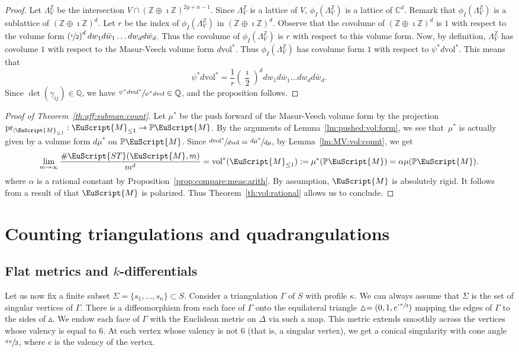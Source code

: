 \documentclass[JEP,XML,SOM,Unicode]{cedram}
\let\mathcal\EuScript
\theoremstyle{plain}
\theoremstyle{definition}
\def\C{\mathbb{C}}
\newcommand\Z{\mathbb{Z}}
\newcommand{\Q}{\mathbb{Q}}
\newcommand{\Pb}{\mathbb{P}}
\newcommand{\cM}{\mathcal{M}}
\newcommand{\ST}{\mathcal{ST}}
\newcommand{\vol}{\mathrm{vol}}
\newcommand{\pr}{\mathrm{pr}}
\let\G\Gamma
\begin{document}
\begin{proof}
Let $\Lambda^\Z_V$ be the intersection $V\cap(\Z\oplus\imath\Z)^{2g+n-1}$. Since $\Lambda^\Z_V$ is a lattice of $V$, $\phi_I(\Lambda^\Z_V)$ is a lattice of $\C^d$. Remark that $\phi_I(\Lambda^\Z_V)$ is a sublattice of $(\Z\oplus\imath\Z)^d$. Let $r$ be the index of $\phi_I(\Lambda^\Z_V)$ in $(\Z\oplus\imath\Z)^d$. Observe that the covolume of $(\Z\oplus\imath\Z)^d$ is $1$ with respect to the volume form $\left(\sfrac{\imath}{2}\right)^ddw_1d\bar{w}_1\dots dw_d d\bar{w}_d$. Thus the covolume of $\phi_I(\Lambda^\Z_V)$ is $r$ with respect to this volume form.
Now, by definition, $\Lambda^\Z_V$ has covolume $1$ with respect to the Masur-Veech volume form $d\vol^*$. Thus $\phi_I(\Lambda^\Z_V)$ has covolume form $1$ with respect to $\psi^*d\vol^*$. This means that
\[
\psi^*d\vol^*=\frac{1}{r}\left(\frac{\imath}{2}\right)^ddw_1d\bar{w}_1\dots dw_d d\bar{w}_d.
\]
Since $\det(\gamma_{ij}) \in \Q$, we have $\sfrac{\psi^*d\vol^*}{\psi^*d\vol} \in \Q$, and the proposition follows.
\end{proof}

\begin{proof}[Proof of Theorem~\ref{th:aff:subman:count}]
Let $\mu^*$ be the push forward of the Masur-Veech volume form by the projection $\pr_{|\cM_{\leq 1}}: \cM_{\leq 1} \to \Pb\cM$.
By the arguments of Lemma~\ref{lm:pushed:vol:form}, we see that~$\mu^*$ is actually given by a volume form $d\mu^*$ on $\Pb\cM$.
Since $\sfrac{d\vol^*}{d\vol}=\sfrac{d\mu^*}{d\mu}$, by Lemma~\ref{lm:MV:vol:count}, we get
\[
\lim_{m\to \infty}\frac{\#\ST(\cM,m)}{m^d}=\vol^*(\cM_{\leq1}):=\mu^*(\Pb\cM)=\alpha\mu(\Pb\cM).
\]
where $\alpha$ is a rational constant by Proposition~\ref{prop:compare:meas:arith}. By assumption, $\cM$ is absolutely rigid. It follows from a result of \cite{AEM17} that $\cM$ is polarized. Thus Theorem~\ref{th:vol:rational} allows us to conclude.
\end{proof}

\section{Counting triangulations and quadrangulations}\label{sec:count:tiling}
\subsection{Flat metrics and $k$-differentials}\label{sec:flat:kdiff}
Let us now fix a finite subset $\Sigma=\{s_1,\dots,s_n\} \subset S$. Consider a triangulation $\G$ of $S$ with profile $\kappa$. We can always assume that $\Sigma$ is the set of singular vertices of $\G$.
There is a diffeomorphism from each face of $\G$ onto the equilateral triangle $\vartriangle=(0,1,e^{\sfrac{\imath\pi}{3}})$ mapping the edges of $\G$ to the sides of $\vartriangle$.
We endow each face of $\G$ with the Euclidean metric on $\Delta$ via such a map.
This metric extends smoothly across the vertices whose valency is equal to $6$.
At each vertex whose valency is not $6$ (that is, a singular vertex), we get a conical singularity with cone angle $\sfrac{\pi e}{3}$, where $e$ is the valency of the vertex.
\end{document}
